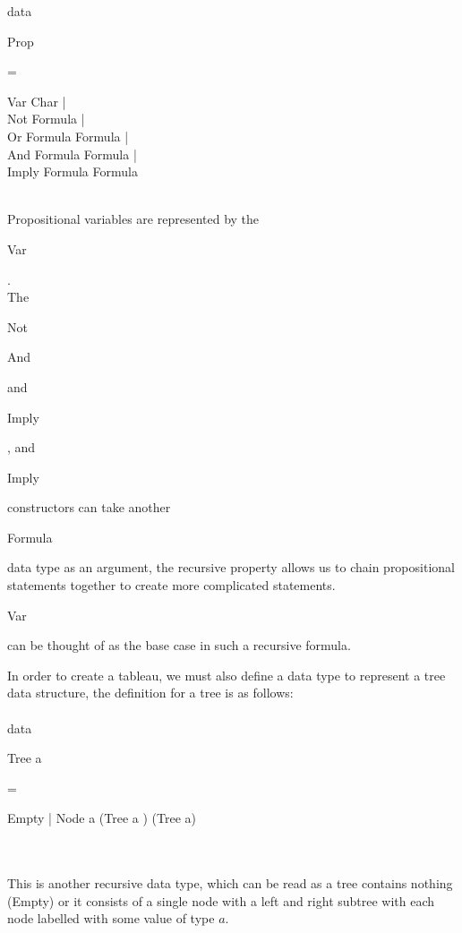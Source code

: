 \documentclass{article}%
\begin{document}
data \begin{myTypeNameStyle} Prop \end{myTypeNameStyle} = \begin{myConstructorStyle} Var Char |\\\-\hspace{3.15cm}Not Formula |\\\-\hspace{3.15cm}Or Formula Formula |\\\-\hspace{3.15cm}And Formula Formula |\\\-\hspace{3.15cm}Imply Formula Formula \end{myConstructorStyle}\\
Propositional variables are represented by the \begin{myConstructorStyle}Var \end{myConstructorStyle}. \\
The \begin{myConstructorStyle}Not \end{myConstructorStyle} \begin{myConstructorStyle}And \end{myConstructorStyle} and \begin{myConstructorStyle}Imply \end{myConstructorStyle}, and \begin{myConstructorStyle}Imply \end{myConstructorStyle} constructors can take another \begin{myTypeNameStyle}Formula\end{myTypeNameStyle} data type as an argument, the recursive property allows us to chain propositional statements together to create more complicated statements. \begin{myConstructorStyle}Var \end{myConstructorStyle} can be thought of as the base case in such a recursive formula. 

In order to create a tableau, we must also define a data type to represent a tree data structure, the definition for a tree is as follows: \\\\
data \begin{myTypeNameStyle} Tree a\end{myTypeNameStyle} = \begin{myConstructorStyle} Empty | Node a (Tree a ) (Tree a) \end{myConstructorStyle}\\\\
This is another recursive data type, which can be read as a tree contains nothing (Empty) or it consists of a single node with a left and right subtree with each node labelled with some value of type $a$. 
\end{document}
